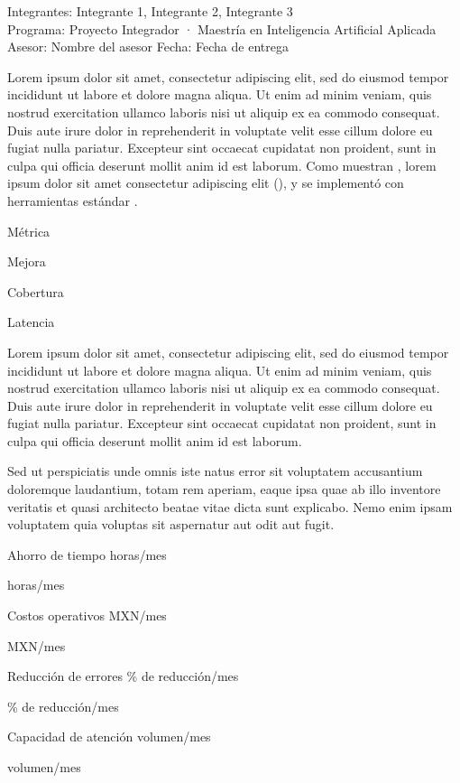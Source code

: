 \documentclass[letterpaper,11pt]{article}
\newcommand{\cifra}[5]{%
  \begingroup\setlength{\fboxsep}{5pt}%
  \colorbox{#1}{\parbox[t]{\dimexpr\linewidth-2\fboxsep\relax}{%
    \setstretch{1}\color{#2}{\Large\bfseries #3}\par
    #4%
    \ifx\relax#5\relax\else\par{\footnotesize #5}\fi}}%
  \endgroup}
\newcommand{\cifragris}[4]{\cifra{black!8}{black}{#1}{#2}{#3}}
\newcommand{\lorem}{Lorem ipsum dolor sit amet, consectetur adipiscing elit, sed do eiusmod tempor incididunt ut labore et dolore magna aliqua. Ut enim ad minim veniam, quis nostrud exercitation ullamco laboris nisi ut aliquip ex ea commodo consequat.
Duis aute irure dolor in reprehenderit in voluptate velit esse cillum dolore eu fugiat nulla pariatur. Excepteur sint occaecat cupidatat non proident, sunt in culpa qui officia deserunt mollit anim id est laborum.}
\newcommand{\loremb}{Sed ut perspiciatis unde omnis iste natus error sit voluptatem accusantium doloremque laudantium, totam rem aperiam, eaque ipsa quae ab illo inventore veritatis et quasi architecto beatae vitae dicta sunt explicabo. Nemo enim ipsam voluptatem quia voluptas sit aspernatur aut odit aut fugit.}
\begin{document}
\thispagestyle{primera}

\smallskip
\noindent{\large\textcolor{black!60}{Resumen ejecutivo}\par}
\medskip

\noindent\begingroup\setlength{\fboxsep}{7pt}%
\colorbox{black!8}{\parbox{\dimexpr\linewidth-2\fboxsep\relax}{\small{}%
\textcolor{black!60}{Integrantes:} Integrante 1, Integrante 2, Integrante 3\\
\textcolor{black!60}{Programa:} Proyecto Integrador · Maestría en Inteligencia Artificial Aplicada\\
\textcolor{black!60}{Asesor:} Nombre del asesor \quad \textcolor{black!60}{Fecha:} Fecha de entrega}}%
\endgroup\par\medskip

\lorem{} Como muestran \textcite{breiman2001}, lorem ipsum dolor sit amet consectetur adipiscing elit (\cite{hastie2009}), y se implementó con herramientas estándar \parencite{pedregosa2011}.

\medskip
\noindent
\begin{minipage}[t]{0.235\linewidth}\cifragris{0.71}{Métrica}{}{}\end{minipage}\hfill
\begin{minipage}[t]{0.235\linewidth}\cifragris{+12\,\%}{Mejora}{}{}\end{minipage}\hfill
\begin{minipage}[t]{0.235\linewidth}\cifragris{92\,\%}{Cobertura}{}{}\end{minipage}\hfill
\begin{minipage}[t]{0.235\linewidth}\cifragris{3\,s}{Latencia}{}{}\end{minipage}
\medskip

\lorem\par
\loremb

\medskip
\noindent
\begin{minipage}[t]{0.485\linewidth}\cifragris{$-$40\,h}{Ahorro de tiempo}{horas/mes}{}\end{minipage}\hfill
\begin{minipage}[t]{0.485\linewidth}\cifragris{$-$\$X}{Costos operativos}{MXN/mes}{}\end{minipage}

\vspace{5pt}
\noindent
\begin{minipage}[t]{0.485\linewidth}\cifragris{$-$25\,\%}{Reducción de errores}{\% de reducción/mes}{}\end{minipage}\hfill
\begin{minipage}[t]{0.485\linewidth}\cifragris{+30\,\%}{Capacidad de atención}{volumen/mes}{}\end{minipage}
\end{document}
